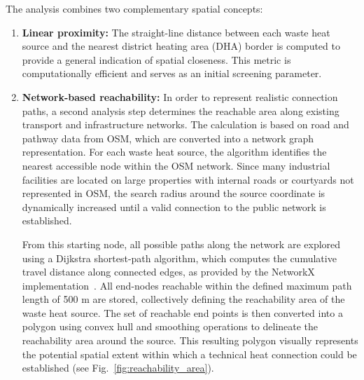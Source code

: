 \documentclass[letterpaper,11pt]{article}
\begin{document}
The analysis combines two complementary spatial concepts:
\begin{enumerate}
	\item \textbf{Linear proximity:} The straight-line distance between each waste heat source and the nearest district heating area (DHA) border is computed to provide a general indication of spatial closeness. This metric is computationally efficient and serves as an initial screening parameter.
	\item \textbf{Network-based reachability:} In order to represent realistic connection paths, a second analysis step determines the reachable area along existing transport and infrastructure networks. 
	The calculation is based on road and pathway data from OSM, which are converted into a network graph representation. 
	For each waste heat source, the algorithm identifies the nearest accessible node within the OSM network. 
	Since many industrial facilities are located on large properties with internal roads or courtyards not represented in OSM, the search radius around the source coordinate is dynamically increased until a valid connection to the public network is established.
	
	From this starting node, all possible paths along the network are explored using a Dijkstra shortest-path algorithm, which computes the cumulative travel distance along connected edges, as provided by the NetworkX implementation~\cite{Hagberg.2008}. 
	All end-nodes reachable within the defined maximum path length of 500 m are stored, collectively defining the reachability area of the waste heat source.
	The set of reachable end points is then converted into a polygon using convex hull and smoothing operations to delineate the reachability area around the source. 
	This resulting polygon visually represents the potential spatial extent within which a technical heat connection could be established (see Fig.~\ref{fig:reachability_area}). 
	

\end{enumerate}
\end{document}
